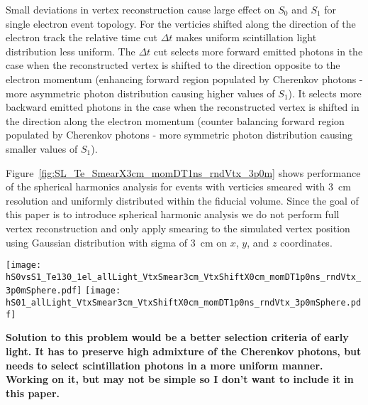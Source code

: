 Small deviations in vertex reconstruction cause large effect
on $S_0$ and $S_1$ for single electron event topology.
For the verticies shifted along the direction of the electron track the relative time cut $\Delta t$
makes uniform scintillation light distribution less uniform. The
$\Delta t$ cut selects more forward emitted photons in the case when
the reconstructed vertex is shifted to the direction opposite to the
electron momentum (enhancing forward region populated by Cherenkov
photons - more asymmetric photon distribution causing higher values of
$S_1$). It selects more backward emitted photons in the case when the
reconstructed vertex is shifted in the direction along the electron
momentum (counter balancing forward region populated by Cherenkov
photons - more symmetric photon distribution causing smaller values of
$S_1$).

Figure~\ref{fig:SL_Te_SmearX3cm_momDT1ns_rndVtx_3p0m} shows performance of the spherical harmonics analysis for events with verticies smeared with 3~cm resolution and uniformly distributed within the fiducial volume. Since the goal of this paper is to introduce spherical harmonic analysis we do not perform full vertex reconstruction and only apply smearing to the simulated vertex position using Gaussian distribution with sigma of 3~cm on $x$, $y$, and $z$ coordinates. 

\begin{figure*}[h]
  \centering
  \texttt{[image: hS0vsS1\_Te130\_1el\_allLight\_VtxSmear3cm\_VtxShiftX0cm\_momDT1p0ns\_rndVtx\_3p0mSphere.pdf]}
  \texttt{[image: hS01\_allLight\_VtxSmear3cm\_VtxShiftX0cm\_momDT1p0ns\_rndVtx\_3p0mSphere.pdf]}
  \caption{Spherical harmonics comparison between $^{130}$Te 0{\nbb}
    decay signal ($Q=2.529$~MeV) (\emph{red}) and $^{8}$B solar
    neutrinos background (\emph{blue}) for 1000 simulated
    events.Verticies are uniformly distributed within the fiducial
    volume, R$<$3~m. $^8$Be events are implemented as 2.529~MeV
    electrons with the initial momentum direction uniformly
    distributed within 4$\pi$ solid angle. Vetrex is smeared with 3~cm
    resolution. \emph{Left:} $S_0$ versus $S_1$ scatter plot. Black
    dotted line is a linear fit of these 2D histograms. Variable
    $S_{01}$ is defined as a projection of 2D distribution onto this
    linear fit. \emph{Right:} $S_{01}$}
\label{fig:SL_Te_SmearX3cm_momDT1ns_rndVtx_3p0m}
\end{figure*}


{\bf Solution to this problem would be a better selection criteria of
  early light. It has to preserve high admixture of the Cherenkov
  photons, but needs to select scintillation photons in a more uniform
  manner. Working on it, but may not be simple so I don't want to
  include it in this paper.}


